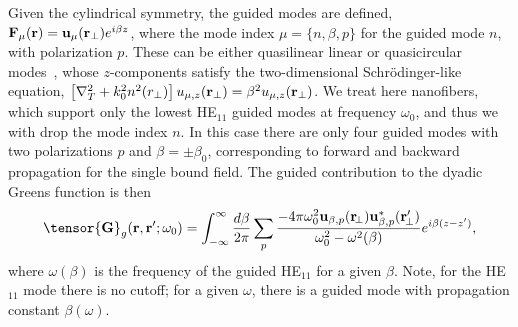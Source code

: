 \documentclass[preprint,aps,pra,onecolumn]{revtex4-1} %
\begin{document}
Given the cylindrical symmetry, the guided modes are defined, $\mathbf{F}_\mu (\mathbf{r}) = \mathbf{u}_\mu 
(\mathbf{r}_\perp) e^{i\beta z}$, where the mode index $\mu=\{n, \beta, p\}$ for the guided mode $n$, with 
polarization $p$.  These can be either quasilinear linear or quasicircular modes~\cite{?}, whose 
$z$-components satisfy the two-dimensional Schr\"{o}dinger-like equation, $\left[\nabla_T^2 +k_0^2 
n^2(r_\perp) \right] u_{\mu,z} (\mathbf{r}_\perp) = \beta^2 u_{\mu,z} (\mathbf{r}_\perp)$.  We treat here nanofibers, 
which support only the lowest HE$_{11}$ guided modes at frequency $\omega_0$, and thus we with 
drop the mode index $n$.  In this case there are only four guided modes with two polarizations $p$ and 
$\beta = \pm \beta_0$, corresponding to forward and backward propagation for the single bound field.  
The guided contribution to the dyadic Greens function is then 
\begin{equation}
\tensor{\mathbf{G}}_g(\br,\br'; \omega_0) = \int_{-\infty}^\infty \frac{d \beta}{2 \pi} \sum_{p} 
\frac{-4\pi\omega_0^2\mathbf{u}_{\beta,p} (\br\!_\perp)\mathbf{u}^*_{\beta,p} 
(\br_{\!\perp}^\prime)}{\omega_0^2-\omega^2(\beta)}e^{i\beta(z-z')},\label{eq:Gganaly}
\end{equation}
where $ \omega(\beta)$ is the frequency of the guided HE$_{11}$ for a given $\beta$.  Note, for the 
HE$_{11}$ mode there is no cutoff; for a given $\omega$, there is a guided mode with propagation 
constant $\beta(\omega)$.  
\end{document}
